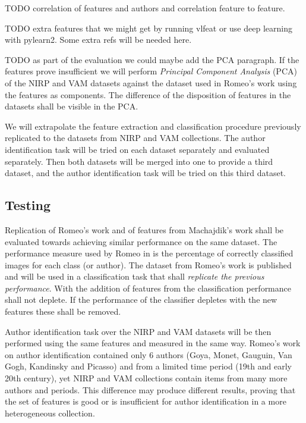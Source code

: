 \documentclass[a4paper]{article}
\begin{document}
TODO correlation of features and authors and correlation feature to feature.

TODO extra features that we might get by running vlfeat or use deep learning
with pylearn2.  Some extra refs will be needed here.

TODO as part of the evaluation we could maybe add the PCA paragraph.  If the
features prove insufficient we will perform \emph{Principal Component Analysis}
(PCA) of the NIRP and VAM datasets against the dataset used in Romeo's work
using the features as components.  The difference of the disposition of
features in the datasets shall be visible in the PCA.

We will extrapolate the feature extraction and classification procedure
previously replicated to the datasets from NIRP and VAM collections.  The
author identification task will be tried on each dataset separately and
evaluated separately.  Then both datasets will be merged into one to provide a
third dataset, and the author identification task will be tried on this third
dataset.


\subsection{Testing}

Replication of Romeo's work and of features from Machajdik's work shall be
evaluated towards achieving similar performance on the same dataset.  The
performance measure used by Romeo in \cite{rmc12ajs} is the percentage of
correctly classified images for each class (or author).  The dataset from
Romeo's work is published and will be used in a classification task that shall
\emph{replicate the previous performance}.  With the addition of features from
\cite{mach10clas} the classification performance shall not deplete.  If the
performance of the classifier depletes with the new features these shall be
removed.

Author identification task over the NIRP and VAM datasets will be then
performed using the same features and measured in the same way.  Romeo's work
on author identification contained only 6 authors (Goya, Monet, Gauguin, Van
Gogh, Kandinsky and Picasso) and from a limited time period (19th and early
20th century), yet NIRP and VAM collections contain items from many more
authors and periods.  This difference may produce different results, proving
that the set of features is good or is insufficient for author identification
in a more heterogeneous collection.
\end{document}
